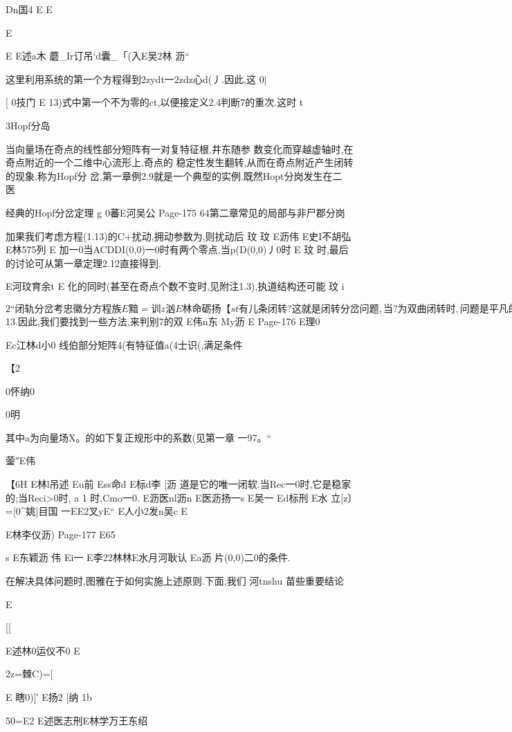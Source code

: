 {{{{{{{{{{{{{{{{{{Dn国4
E
E

E

E
E述a木
蘑_Ir订吊`d囊_「(入E吴2林
沥“

这里利用系统的第一个方程得到2zydt一2zdz心d(丿.因此,这
0|

[
0技门
E
13)式中第一个不为零的ct,以便接定义2.4判断7的重次.这时
t

3Hopf分岛

当向量场在奇点的线性部分短阵有一对复特征根,井东随参
数变化而穿越虚轴时,在奇点附近的一个二维中心流形上,奇点的
稳定性发生翻转,从而在奇点附近产生闭转的现象,称为Hopf分
岔,第一章例2.9就是一个典型的实例.既然Hopt分岗发生在二
医

经典的Hopf分岔定理
g
0蕃E河吴公
Page-175
64第二章常见的局部与非尸郡分岗

加果我们考虑方程(1.13)的C+扰动,拥动参数为,则扰动后
玟
玟
E沥伟
E史I不胡弘
E林575列
E
加一0当ACDDI(0,0)一0时有两个零点,当p(D(0,0)丿0时
E
玟
时,最后的讨论可从第一章定理2.12直接得到.

E河玟育余t
E
化的同时(甚至在奇点个数不变时,见附注1.3),执道结构还可能
玟
i

$2“闭轨分岔

考忠徽分方程族
E黯=训z汹%

E林命砺扬
【st
有儿条闭转?这就是闭转分岔问题,当?为双曲闭转时,问题是平
凡的(见第一章$13.因此,我们要找到一些方法,来判别7的双
E伟n东
My沥
E
Page-176
E理0

Ec江林d小0
线伯部分矩阵4(有特征值a(4士识(,满足条件

【2

0怀纳0

0明

其中a为向量场X。的如下复正规形中的系数(见第一章
一97。“

蓥″E伟

【6H
E林l吊述
Eu前
Ess命d
E标d李
[沥
道是它的唯一闭软.当Rec一0时,它是稳家的;当Reci>0时,
a
1
时,Cmo一0.
E沥医nl沥n
E医沥扬一s
E吴一
Ed标刑
E水
立[z〕=[0^姚]目国
一EE2叉yE“
E人小2发n吴c
E

E林李仪沥)
Page-177
E65

s
E东颖沥
伟
Ei一
E李22林林E水月河耿认
Ea沥
片(0,0)二0的条件.

在解决具体问题时,图雅在于如何实施上述原则.下面,我们
河tnshu
苗些重要结论

E

[[

E述林0运仪不0
E

2z=棘C)=[

E
瞎0)]′
E扬2
[纳
1b

50=E2
E述医志刑E林学万王东绍

}}}}}}}}}}}}}}}}}}
